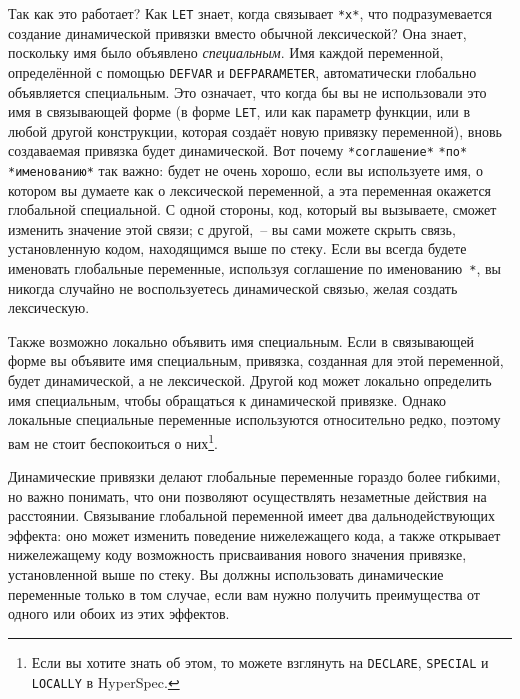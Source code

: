 Так как это работает? Как \lstinline{LET} знает, когда связывает \lstinline{*x*}, что
подразумевается создание динамической привязки вместо обычной лексической? Она знает,
поскольку имя было объявлено \textit{специальным}. Имя каждой переменной, определённой с по\-мощью \lstinline{DEFVAR} и
\lstinline{DEFPARAMETER}, автоматически глобально объявляется спе\-циаль\-ным. Это означает,
что когда бы вы не использовали это имя в связывающей форме (в форме \lstinline{LET}, или
как параметр функции, или в любой другой конструкции, которая создаёт новую привязку
переменной), вновь создаваемая привязка будет динамической. Вот почему \lstinline{*соглашение*}
\lstinline{*по*} \lstinline{*именованию*} так важно: будет не очень хорошо, если вы используете имя,
о котором вы думаете как о лексической переменной, а эта переменная окажется глобальной
специальной. С одной стороны, код, который вы вызываете, сможет изменить значение этой
связи; с другой,~-- вы сами можете скрыть связь, установленную кодом, находящимся выше по
стеку. Если вы всегда будете именовать глобальные переменные, используя соглашение по
именованию~\lstinline{*}, вы никогда случайно не воспользуетесь динамической связью, желая создать
лексическую.

Также возможно локально объявить имя специальным. Если в связывающей форме вы объявите имя
специальным, привязка, созданная для этой переменной, будет динамической, а не
лексической. Другой код может локально определить имя специальным, чтобы обращаться к
динамической привязке. Однако локальные специальные переменные используются относительно
редко, поэтому вам не стоит беспокоиться о них\footnote{Если вы хотите знать об этом, то
  можете взглянуть на \lstinline{DECLARE}, \lstinline{SPECIAL} и \lstinline{LOCALLY} в HyperSpec.}\hspace{\footnotenegspace}.

Динамические привязки делают глобальные переменные гораздо более гибкими, но важно понимать,
что они позволяют осуществлять незаметные действия на расстоянии. Связывание глобальной
переменной имеет два дальнодействующих эффекта: оно может изменить поведение нижележащего кода,
а также открывает нижележащему коду возможность присваивания нового значения привязке,
установленной выше по стеку. Вы должны использовать динамические переменные только в том
случае, если вам нужно получить преимущества от одного или обоих из этих эффектов.

